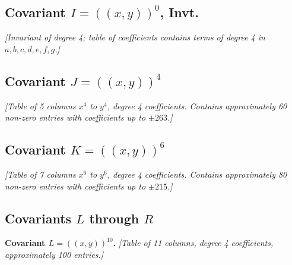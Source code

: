 \documentclass[11pt,a4paper]{article}
\theoremstyle{cayley}
\begin{document}
\subsection*{Covariant $I = (\!\!(x,y)\!\!)^{0}$, Invt.}

\textit{[Invariant of degree 4; table of coefficients contains terms of degree 4 in $a,b,c,d,e,f,g$.]}

\subsection*{Covariant $J = (\!\!(x,y)\!\!)^{4}$}

\textit{[Table of 5 columns $x^{4}$ to $y^{4}$, degree 4 coefficients. Contains approximately 60 non-zero entries with coefficients up to $\pm263$.]}

\subsection*{Covariant $K = (\!\!(x,y)\!\!)^{6}$}

\textit{[Table of 7 columns $x^{6}$ to $y^{6}$, degree 4 coefficients. Contains approximately 80 non-zero entries with coefficients up to $\pm215$.]}

\newpage

\subsection*{Covariants $L$ through $R$}

\textbf{Covariant $L = (\!\!(x,y)\!\!)^{10}$.} \textit{[Table of 11 columns, degree 4 coefficients, approximately 100 entries.]}
\end{document}
